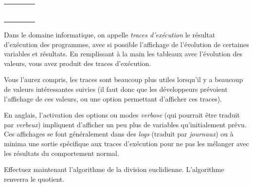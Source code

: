 \documentclass[11pt,a4paper]{article}
\begin{document}
\begin{table}[h!]
\begin{minipage}{0.4\textwidth}
\begin{tabular}{|C{1cm}|C{1cm}|C{1cm}|C{1cm}|}
             &     &     &   \\
        \hline
             &     &     &   \\
             &     &     &     \\
             &     &     &   \\
        \hline
             &     &     &   \\
             &     &     &     \\
             &     &     &   \\
        \hline
    \end{tabular}
  \end{minipage}
\end{table}

\bigskip

Dans le domaine informatique, on appelle \textit{traces d'exécution} le résultat d'exécution des programmes, avec si possible l'affichage de l'évolution de certaines variables et résultats.
En remplissant à la main les tableaux avec l'évolution des valeurs, vous avez produit des traces d'exécution.

Vous l'aurez compris, les traces sont beaucoup plus utiles lorsqu'il y a beaucoup de valeurs intéressantes suivies (il faut donc que les développeurs prévoient l'affichage de ces valeurs, ou une option permettant d'afficher ces traces).

En anglais, l'activation des options ou modes \textit{verbose} (qui pourrait être traduit par \textit{verbeux}) impliquent d'afficher un peu plus de variables qu'initialement prévu.
Ces affichages se font généralement dans des \textit{logs} (traduit par \textit{journaux}) ou à minima une sortie spécifique aux traces d'exécution pour ne pas les mélanger avec les résultats du comportement normal.

\vfillLast

\newpage

\vfillFirst


Effectuez maintenant l'algorithme de la division euclidienne.
L'algorithme renverra le quotient.


\bigskip
\end{document}
